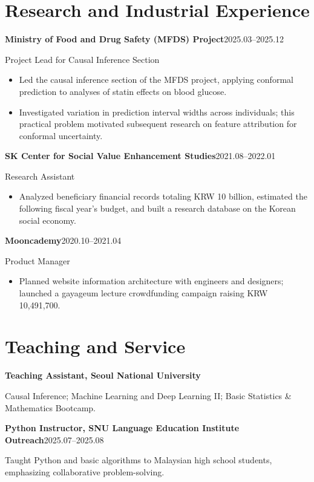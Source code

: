 \documentclass[a4paper,10pt]{article}
\newcommand{\entry}[2]{\textbf{#1}\hfill #2\par}
\begin{document}
\section{Research and Industrial Experience}
\entry{Ministry of Food and Drug Safety (MFDS) Project}{2025.03--2025.12}
Project Lead for Causal Inference Section\par
\begin{itemize}
\item Led the causal inference section of the MFDS project, applying conformal prediction to analyses of statin effects on blood glucose.
\item Investigated variation in prediction interval widths across individuals; this practical problem motivated subsequent research on feature attribution for conformal uncertainty.
\end{itemize}
\vspace{3pt}
\entry{SK Center for Social Value Enhancement Studies}{2021.08--2022.01}
Research Assistant\par
\begin{itemize}
\item Analyzed beneficiary financial records totaling KRW 10 billion, estimated the following fiscal year's budget, and built a research database on the Korean social economy.
\end{itemize}
\vspace{3pt}
\entry{Mooncademy}{2020.10--2021.04}
Product Manager\par
\begin{itemize}
\item Planned website information architecture with engineers and designers; launched a gayageum lecture crowdfunding campaign raising KRW 10,491,700.
\end{itemize}
\vspace{3pt}
\section{Teaching and Service}
\entry{Teaching Assistant, Seoul National University}{}
Causal Inference; Machine Learning and Deep Learning II; Basic Statistics \& Mathematics Bootcamp.\par
\vspace{5pt}
\entry{Python Instructor, SNU Language Education Institute Outreach}{2025.07--2025.08}
Taught Python and basic algorithms to Malaysian high school students, emphasizing collaborative problem-solving.\par
\vspace{5pt}
\end{document}
